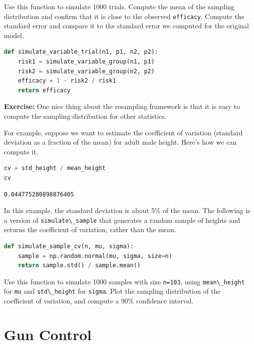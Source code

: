 Use this function to simulate 1000 trials. Compute the mean of the
sampling distribution and confirm that it is close to the observed
\passthrough{\lstinline!efficacy!}. Compute the standard error and
compare it to the standard error we computed for the original model.

\begin{lstlisting}[language=Python,style=source]
def simulate_variable_trial(n1, p1, n2, p2):
    risk1 = simulate_variable_group(n1, p1)
    risk2 = simulate_variable_group(n2, p2)
    efficacy = 1 - risk2 / risk1
    return efficacy
\end{lstlisting}

\textbf{Exercise:} One nice thing about the resampling framework is that
it is easy to compute the sampling distribution for other statistics.

For example, suppose we want to estimate the coefficient of variation
(standard deviation as a fraction of the mean) for adult male height.
Here's how we can compute it.

\begin{lstlisting}[language=Python,style=source]
cv = std_height / mean_height
cv
\end{lstlisting}

\begin{lstlisting}[style=output]
0.044775280898876405
\end{lstlisting}

In this example, the standard deviation is about 5\% of the mean. The
following is a version of \passthrough{\lstinline!simulate\_sample!}
that generates a random sample of heights and returns the coefficient of
variation, rather than the mean.

\begin{lstlisting}[language=Python,style=source]
def simulate_sample_cv(n, mu, sigma):
    sample = np.random.normal(mu, sigma, size=n)
    return sample.std() / sample.mean()
\end{lstlisting}

Use this function to simulate 1000 samples with size
\passthrough{\lstinline!n=103!}, using
\passthrough{\lstinline!mean\_height!} for \passthrough{\lstinline!mu!}
and \passthrough{\lstinline!std\_height!} for
\passthrough{\lstinline!sigma!}. Plot the sampling distribution of the
coefficient of variation, and compute a 90\% confidence interval.

\hypertarget{gun-control}{%
\section{Gun Control}\label{gun-control}}

